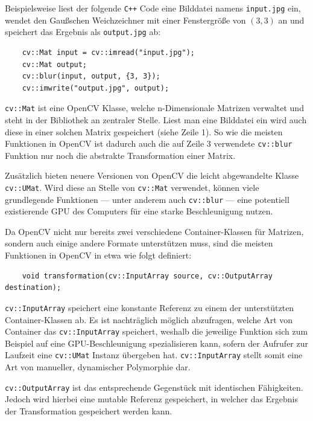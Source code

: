 Beispielsweise liest der folgende \texttt{C++} Code eine Bilddatei namens \texttt{input.jpg} ein, wendet den Gaußschen Weichzeichner mit einer Fenstergröße von \((3,3)\) an und speichert das Ergebnis als \texttt{output.jpg} ab:
\begin{verbatim}
    cv::Mat input = cv::imread("input.jpg");
    cv::Mat output;
    cv::blur(input, output, {3, 3});
    cv::imwrite("output.jpg", output);
\end{verbatim}

\texttt{cv::Mat} ist eine OpenCV Klasse, welche n-Dimensionale Matrizen verwaltet und steht in der Bibliothek an zentraler Stelle.
Liest man eine Bilddatei ein wird auch diese in einer solchen Matrix gespeichert (siehe Zeile 1).
So wie die meisten Funktionen in OpenCV ist dadurch auch die auf Zeile 3 verwendete \texttt{cv::blur} Funktion nur noch die abstrakte Transformation einer Matrix.

Zusätzlich bieten neuere Versionen von OpenCV die leicht abgewandelte Klasse \texttt{cv::UMat}.
Wird diese an Stelle von \texttt{cv::Mat} verwendet, können viele grundlegende Funktionen --- unter anderem auch \texttt{cv::blur} --- eine potentiell existierende GPU des Computers für eine starke Beschleunigung nutzen.

Da OpenCV nicht nur bereits zwei verschiedene Container-Klassen für Matrizen, sondern auch einige andere Formate unterstützen muss, sind die meisten Funktionen in OpenCV in etwa wie folgt definiert:
\begin{verbatim}
    void transformation(cv::InputArray source, cv::OutputArray destination);
\end{verbatim}

\texttt{cv::InputArray} speichert eine konstante Referenz zu einem der unterstützten Container-Klassen ab.
Es ist nachträglich möglich abzufragen, welche Art von Container das \texttt{cv::InputArray} speichert, weshalb die jeweilige Funktion sich zum Beispiel auf eine GPU-Beschleunigung spezialisieren kann, sofern der Aufrufer zur Laufzeit eine \texttt{cv::UMat} Instanz übergeben hat.
\texttt{cv::InputArray} stellt somit eine Art von manueller, dynamischer Polymorphie dar.

\texttt{cv::OutputArray} ist das entsprechende Gegenstück mit identischen Fähigkeiten.
Jedoch wird hierbei eine mutable Referenz gespeichert, in welcher das Ergebnis der Transformation gespeichert werden kann.
